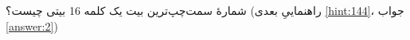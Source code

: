 \section{}
\paragraph{}\label{hint:332}
شمارهٔ سمت‌چپ‌ترین بیت یک کلمه 16 بیتی چیست؟ (راهنماییِ بعدی \ref{hint:144}، جواب \ref{answer:2})